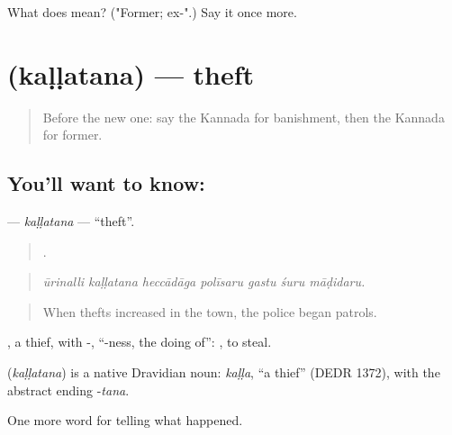 \begin{tcolorbox}[breakable,colback=teal!4,colframe=teal!35!black,title={Before you move on}]
What does  mean? ("Former; ex-".) Say it once more.
\end{tcolorbox}
\section[\texorpdfstring{\kn{ಕಳ್ಳತನ} (kaḷḷatana)}{ಕಳ್ಳತನ (kaḷḷatana)}]{ (kaḷḷatana) — theft}

\label{lesson:KA-C372-kallatana}



\begin{quote}
Before the new one: say the Kannada for banishment, then the Kannada for former.
\end{quote}

\subsection*{You'll want to know: }
\textbf{} — \emph{kaḷḷatana} — \textquotedblleft{}theft\textquotedblright{}.

\begin{quote}
      .
\end{quote}

\begin{quote}
\emph{ūrinalli kaḷḷatana heccādāga polīsaru gastu śuru māḍidaru.}
\end{quote}

\begin{quote}
When thefts increased in the town, the police began patrols.
\end{quote}

, a thief, with -, \textquotedblleft{}-ness, the doing of\textquotedblright{}:  , to steal.

\begin{cousinweb}
\textbf{} (\emph{kaḷḷatana}) is a native Dravidian noun: \emph{kaḷḷa}, \textquotedblleft{}a thief\textquotedblright{} (DEDR 1372), with the abstract ending -\emph{tana}.
\end{cousinweb}

\begin{grammarlens}[title={What you've built}]
One more word for telling what happened.
\end{grammarlens}

